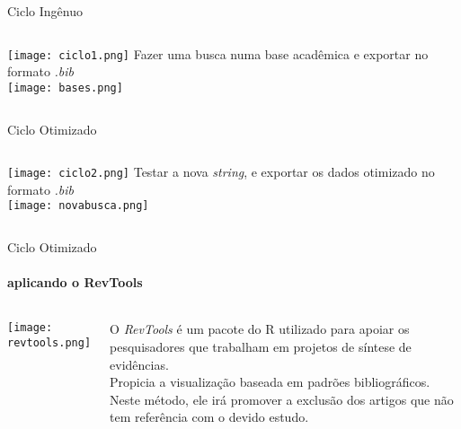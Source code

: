 \begin{frame}[t]{Ciclo Ingênuo}
    
    \begin{columns}
            \centering
            \texttt{[image: ciclo1.png]}
            \centering
            Fazer uma busca numa base acadêmica e exportar no formato \emph{.bib}\\

            \vspace*{0.2cm}
            \texttt{[image: bases.png]}
    \end{columns}

\end{frame}
\begin{frame}[t]{Ciclo Otimizado}
    
    \begin{columns}
            \centering
            \texttt{[image: ciclo2.png]}
            \centering
            Testar a nova \emph{string}, e exportar os dados otimizado no formato \emph{.bib}\\

            \vspace*{0.2cm}
            \texttt{[image: novabusca.png]}
    \end{columns}

\end{frame}
\begin{frame}[c]{Ciclo Otimizado}
    \framesubtitle{aplicando o RevTools}
    \begin{columns}
            \centering
            \texttt{[image: revtools.png]}
    
            O \emph{RevTools} é um pacote do R utilizado para apoiar os pesquisadores que trabalham em projetos de síntese de evidências. \\
            Propicia a visualização baseada em padrões bibliográficos.\\
            Neste método, ele irá promover a exclusão dos artigos que não tem referência com o devido estudo.

    \end{columns}

\end{frame}
